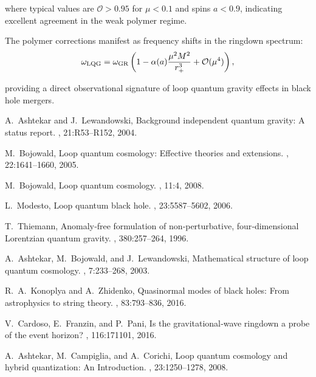 \documentclass[11pt]{article}
\begin{document}
where typical values are $\mathcal{O} > 0.95$ for $\mu < 0.1$ and spins $a < 0.9$, indicating excellent agreement in the weak polymer regime.

The polymer corrections manifest as frequency shifts in the ringdown spectrum:
\begin{equation}
\omega_{\rm LQG} = \omega_{\rm GR}\left(1 - \alpha(a)\frac{\mu^2 M^2}{r_+^3} + \mathcal{O}(\mu^4)\right),
\end{equation}

providing a direct observational signature of loop quantum gravity effects in black hole mergers.


\begin{thebibliography}{9}

A.~Ashtekar and J.~Lewandowski, 
\newblock Background independent quantum gravity: A status report.
, 21:R53–R152, 2004.

M.~Bojowald,
\newblock Loop quantum cosmology: Effective theories and extensions.
, 22:1641–1660, 2005.

M.~Bojowald,
\newblock Loop quantum cosmology.
, 11:4, 2008.

L.~Modesto,
\newblock Loop quantum black hole.
, 23:5587–5602, 2006.

T.~Thiemann,
\newblock Anomaly‐free formulation of non‐perturbative, four‐dimensional Lorentzian quantum gravity.
, 380:257–264, 1996.

A.~Ashtekar, M.~Bojowald, and J.~Lewandowski,
\newblock Mathematical structure of loop quantum cosmology.
, 7:233–268, 2003.

R.~A.~Konoplya and A.~Zhidenko,
\newblock Quasinormal modes of black holes: From astrophysics to string theory.
, 83:793–836, 2016.

V.~Cardoso, E.~Franzin, and P.~Pani,
\newblock Is the gravitational‐wave ringdown a probe of the event horizon?
, 116:171101, 2016.

A.~Ashtekar, M.~Campiglia, and A.~Corichi,
\newblock Loop quantum cosmology and hybrid quantization: An Introduction.
, 23:1250–1278, 2008.


\end{thebibliography}
\end{document}

